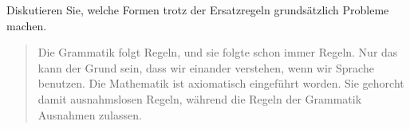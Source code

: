 \documentclass[12pt,a4paper,twoside]{article}
\begin{document}
Diskutieren Sie, welche Formen trotz der Ersatzregeln grundsätzlich Probleme machen.

\begin{quote}
  Die Grammatik folgt Regeln, und sie folgte schon immer Regeln.
  Nur das kann der Grund sein, dass wir einander verstehen, wenn wir Sprache benutzen.
  Die Mathematik ist axiomatisch eingeführt worden.
  Sie gehorcht damit ausnahmslosen Regeln, während die Regeln der Grammatik Ausnahmen zulassen.
\end{quote}


\end{document}
